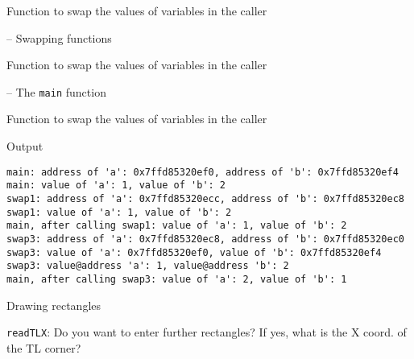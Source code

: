 \documentclass[usenames,dvipsnames,aspectratio=169]{beamer}
\begin{document}
\begin{frame}{Function to swap the values of variables in the caller}
  \begin{exampleblock}{ -- Swapping functions}
    \scriptsize
    
  \end{exampleblock}
\end{frame}

\begin{frame}{Function to swap the values of variables in the caller}
  \begin{exampleblock}{ -- The \texttt{main} function}
    \footnotesize
    
  \end{exampleblock}
\end{frame}

\begin{frame}[fragile]{Function to swap the values of variables in the caller}
  \begin{block}{Output}
    \footnotesize
    \begin{verbatim}
main: address of 'a': 0x7ffd85320ef0, address of 'b': 0x7ffd85320ef4
main: value of 'a': 1, value of 'b': 2
swap1: address of 'a': 0x7ffd85320ecc, address of 'b': 0x7ffd85320ec8
swap1: value of 'a': 1, value of 'b': 2
main, after calling swap1: value of 'a': 1, value of 'b': 2
swap3: address of 'a': 0x7ffd85320ec8, address of 'b': 0x7ffd85320ec0
swap3: value of 'a': 0x7ffd85320ef0, value of 'b': 0x7ffd85320ef4
swap3: value@address 'a': 1, value@address 'b': 2
main, after calling swap3: value of 'a': 2, value of 'b': 1
\end{verbatim}
  \end{block}
\end{frame}

\begin{frame}{Drawing rectangles}
  \scriptsize
  \begin{exampleblock}{ \texttt{readTLX}: Do you want to enter further rectangles? If yes, what is the X coord. of the TL corner?}
    \vspace{-.3cm}
    
    \vspace{-.3cm}
  \end{exampleblock}
\end{frame}
\end{document}

